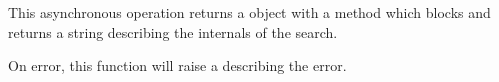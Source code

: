 This asynchronous operation returns a  object with a
 method which blocks and returns a string describing the
internals of the search.

On error, this function will raise a  describing
the error.
